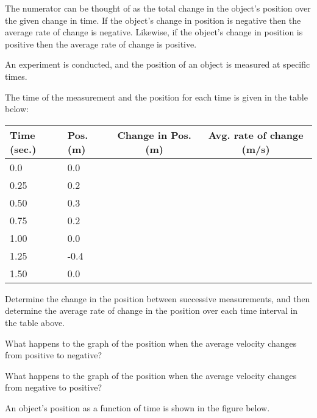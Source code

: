\begin{problem}
\scalebox{0.5}{}

The numerator can be thought of as the total change in the object's
position over the given change in time. If the object's change in
position is negative then the average rate of change is
negative. Likewise, if the object's change in position is positive
then the average rate of change is positive.

\clearpage


\item An experiment is conducted, and the position of an object is
  measured at specific times. 
  \begin{subproblem}
  \item The time of the measurement and the
    position for each time is given in the table below: \\
  \begin{tabular}{l|l|c|c}
    Time (sec.) & Pos. (m) & Change in Pos. (m) & Avg. rate of change (m/s) \\ \hline
    0.0  &  0.0 & \\ [12pt]
    0.25 &  0.2 & \\ [12pt]
    0.50 &  0.3 & \\ [12pt]
    0.75 &  0.2 & \\ [12pt]
    1.00 &  0.0 & \\ [12pt]
    1.25 & -0.4 & \\ [12pt]
    1.50 &  0.0 &
  \end{tabular}

  Determine the change in the position between successive
  measurements, and then determine the average rate of change in the
  position over each time interval in the table above.

  \item What happens to the graph of the position when the average
    velocity changes from positive to negative?  
    \vfill

  \item What happens to the graph of the position when the average
    velocity changes from negative to positive?
    \vfill

  \end{subproblem}

  \clearpage

  \item An object's position as a function of time is shown in the
    figure below. 

    \scalebox{0.5}{}


\end{problem}
